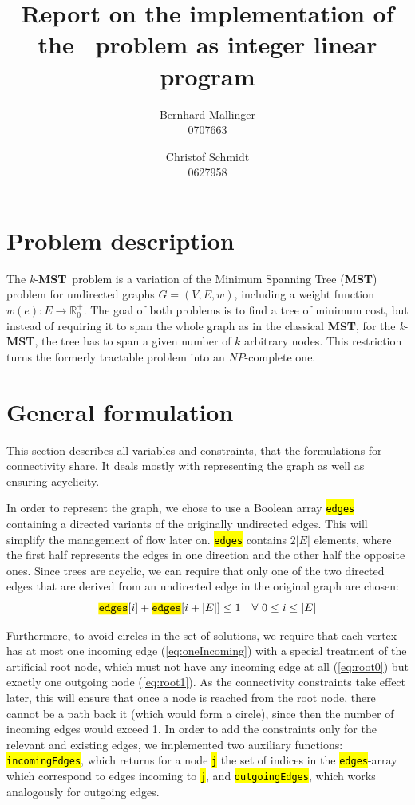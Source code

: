 \documentclass[,%
			paper=a4,%
			DIV14,
			liststotoc,
			bibtotoc,
			draft=false,%
			numbers=noendperiod
			]{scrartcl}
\title{Report on the implementation of the \kmst\ problem as integer linear program}
\author{Bernhard Mallinger \\ 0707663 \and Christof Schmidt \\ 0627958}
\newcommand{\mst}{\textbf{MST}}
\newcommand{\kmst}{\textit{k}-\mst}
\newcommand{\ilc}[1]{\hl{\texttt{#1}}} %
\begin{document}
\maketitle

\section{Problem description}

The \kmst\ problem is a variation of the Minimum Spanning Tree (\mst) problem for undirected graphs $G = (V, E, w)$, including a weight function $w(e) : E \rightarrow \mathbb{R}^+_0$.
The goal of both problems is to find a tree of minimum cost, but instead of requiring it to span the whole graph as in the classical \mst, for the \kmst, the tree has to span a given number of $k$ arbitrary nodes.
This restriction turns the formerly tractable problem into an $NP$-complete one.

\section{General formulation}

This section describes all variables and constraints, that the formulations for connectivity share. It deals mostly with representing the graph as well as ensuring acyclicity.

In order to represent the graph, we chose to use a Boolean array \ilc{edges} containing a directed variants of the originally undirected edges.
This will simplify the management of flow later on.
\ilc{edges} contains $2|E|$ elements, where the first half represents the edges in one direction and the other half the opposite ones.
Since trees are acyclic, we can require that only one of the two directed edges that are derived from an undirected edge in the original graph are chosen:
\begin{equation}
 \ilc{edges}[i] + \ilc{edges}[i + |E|] \leq 1\quad\forall~0\leq i \leq |E|
\end{equation}

Furthermore, to avoid circles in the set of solutions, we require that each vertex has at most one incoming edge (\eqref{eq:oneIncoming}) with a special treatment of the artificial root node, which must not have any incoming edge at all (\eqref{eq:root0}) but exactly one outgoing node (\eqref{eq:root1}). 
As the connectivity constraints take effect later, this will ensure that once a node is reached from the root node, there cannot be a path back it (which would form a circle), since then the number of incoming edges would exceed 1.
In order to add the constraints only for the relevant and existing edges, we implemented two auxiliary functions: \ilc{incomingEdges}, which returns for a node \ilc{j} the set of indices in the \ilc{edges}-array which correspond to edges incoming to \ilc{j}, and \ilc{outgoingEdges}, which works analogously for outgoing edges.
\end{document}
